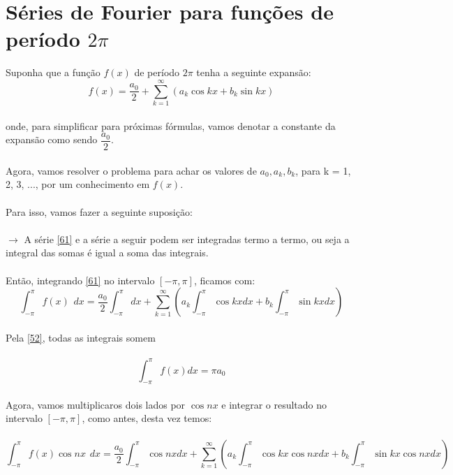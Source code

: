 \documentclass{article}
\begin{document}
\section{Séries de Fourier para funções de período $2\pi$}
Suponha que a função $f(x)$ de período $2\pi$ tenha a seguinte expansão:\\
\begin{equation}
    \label{61}
    f(x) = \dfrac{a_0}{2} + \sum\limits_{k=1}^{\infty}(a_k\cos{kx} + b_k\sin{kx})
\end{equation}
\\
onde, para simplificar para próximas fórmulas, vamos denotar a constante da 
expansão como sendo $\dfrac{a_0}{2}$.\\
\\
Agora, vamos resolver o problema para achar os valores de $a_0, a_k, b_k$, para
k = 1, 2, 3, ..., por um conhecimento em $f(x)$.\\
\\
Para isso, vamos fazer a seguinte suposição:\\
\\
$\to$ A série \ref{61} e a série a seguir podem ser integradas termo a termo, ou seja
a integral das somas é igual a soma das integrais.
\\
\\
Então, integrando \ref{61} no intervalo $[-\pi, \pi]$, ficamos com:\\
\begin{equation}
    \int_{-\pi}^{\pi} f(x)\hspace{5pt}dx = \dfrac{a_0}{2}\int_{-\pi}^{\pi}dx + \sum\limits_{k=1}^{\infty}(a_k\int_{-\pi}^{\pi}\cos{kx}dx + b_k\int_{-\pi}^{\pi}\sin{kx}dx)
\end{equation}
\\
Pela \ref{52}, todas as integrais somem\\
\\
\begin{equation}
    \label{62}
    \int_{-\pi}^{\pi}f(x) dx = \pi a_0
\end{equation}
\\
Agora, vamos multiplicaros dois lados por $\cos{nx}$ e integrar o resultado no 
intervalo $[-\pi, \pi]$, como antes, desta vez temos:\\
\\
\begin{equation}
    \int_{-\pi}^{\pi} f(x)\cos{nx}\hspace{5pt}dx = \dfrac{a_0}{2}\int_{-\pi}^{\pi}\cos{nx}dx + \sum\limits_{k=1}^{\infty}(a_k\int_{-\pi}^{\pi}\cos{kx}\cos{nx}dx + b_k\int_{-\pi}^{\pi}\sin{kx}\cos{nx}dx)
\end{equation}
\end{document}
